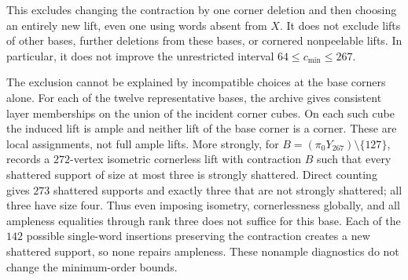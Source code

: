 \documentclass[11pt]{article}
\numberwithin{equation}{section}
\theoremstyle{definition}
\theoremstyle{remark}
\begin{document}
This excludes changing the contraction by one corner deletion and then
choosing an entirely new lift, even one using words absent from $X$.
It does not exclude lifts of other bases, further deletions from these
bases, or cornered nonpeelable lifts. In particular, it does not improve
the unrestricted interval $64\le c_{\min}\le267$.

The exclusion cannot be explained by incompatible choices at the base
corners alone. For each of the twelve representative bases, the archive
 gives consistent layer
memberships on the union of the incident corner cubes. On each such cube
the induced lift is ample and neither lift of the base corner is a
corner. These are local assignments, not full ample lifts.
More strongly, for $B=(\pi_0Y_{267})\setminus\{127\}$,
 records a
$272$-vertex isometric cornerless lift with contraction $B$ such that every shattered support of
size at most three is strongly shattered. Direct counting gives $273$
shattered supports and exactly three that are not strongly shattered;
all three have size four. Thus even imposing isometry, cornerlessness
globally, and all ampleness equalities through rank three does not suffice
for this base. Each of the $142$ possible single-word insertions preserving
the contraction creates a new shattered support, so none repairs ampleness.
These nonample diagnostics do not change the minimum-order bounds.
\end{document}
